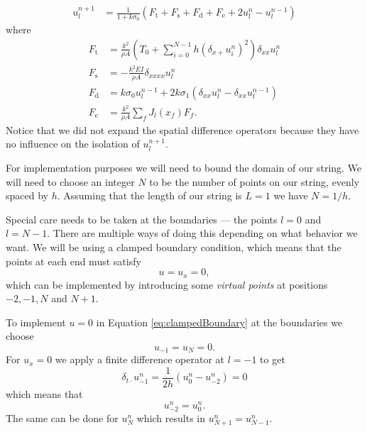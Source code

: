 \documentclass{article}
\begin{document}
\begin{align}
  \label{eq:stringUpdate}
  u^{n+1}_l &= \frac{1}{1 + k\sigma_0} (F_\text{t} + F_\text{s} + F_\text{d} + F_\text{e} + 2u^n_l - u^{n-1}_l)
\end{align}
where
\begin{align}
  F_\text{t} &= \frac{k^2}{\rho A} \left(T_0 + \sum^{N-1}_{i=0} h(\delta_{x+} u^n_i)^2 \right)\delta_{xx}u_l^n \\
  F_\text{s} &= -\frac{k^2 E I}{\rho A} \delta_{xxxx} u^n_l\\
  F_\text{d} &= k\sigma_0u^{n-1}_l + 2k\sigma_1 (\delta_{xx}u^n_l - \delta_{xx}u^{n-1}_l)\\
  F_\text{e} &= \frac{k^2}{\rho A}\sum_fJ_l(x_f)F_f.
\end{align}
Notice that we did not expand the spatial difference operators because they have no influence on the isolation of $u^{n+1}_l$.

For implementation purposes we will need to bound the domain of our string.
We will need to choose an integer $N$ to be the number of points on our string, evenly spaced by $h$.
Assuming that the length of our string is $L = 1$ we have $N = 1 / h$.

Special care needs to be taken at the boundaries --- the points $l=0$ and $l=N-1$.
There are multiple ways of doing this depending on what behavior we want.
We will be using a clamped boundary condition, which means that the points at each end must satisfy\cite[Chapter~7]{bilbao_numerical_2009}
\begin{equation}
\label{eq:clampedBoundary}
  u = u_x = 0,
\end{equation}
which can be implemented by introducing some \textit{virtual points} at positions $-2, -1, N$ and $N+1$.

To implement $u = 0$ in Equation \eqref{eq:clampedBoundary} at the boundaries we choose
\begin{equation}
  u_{-1} = u_{N} = 0.
\end{equation}
For $u_x = 0$ we apply a finite difference operator at $l = -1$ to get
\begin{equation}
  \delta_{t\cdot} u^n_{-1} = \frac{1}{2h}(u^n_0 - u^n_{-2}) = 0
\end{equation}
which means that
\begin{equation}
  u^n_{-2} = u^n_0.
\end{equation}
The same can be done for $u^n_N$ which results in $u^n_{N+1} = u^n_{N-1}$.
\end{document}
